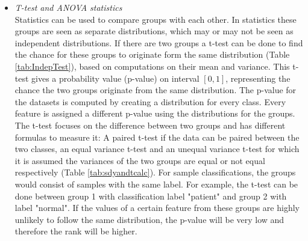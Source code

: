 	\begin{itemize}
	\item \textit{T-test and ANOVA statistics} \\ 
	Statistics can be used to compare groups with each other. In statistics these groups are seen as separate distributions, which may or may not be seen as independent distributions. If there are two groups a t-test can be done to find the chance for these groups to originate form the same distribution\cite{heiberger2004statistical} (Table \ref{tab:IndepTest}), based on computations on their mean and variance. This t-test gives a probability value (p-value) on interval $[0,1]$, representing the chance the two groups originate from the same distribution. The p-value for the datasets is computed by creating a distribution for every class. Every feature is assigned a different p-value using the distributions for the groups.
	The t-test focuses on the difference between two groups and has different formulas to measure it: A paired t-test if the data can be paired between the two classes, an equal variance t-test and an unequal variance t-test for which it is assumed the variances of the two groups are equal or not equal respectively\cite{heiberger2004statistical} (Table \ref{tab:sdyandtcalc}).
	For sample classifications, the groups would consist of samples with the same label. For example, the t-test can be done between group 1 with classification label "patient" and group 2 with label "normal". If the values of a certain feature from these groups are highly unlikely to follow the same distribution, the p-value will be very low and therefore the rank will be higher.
	

\end{itemize}
